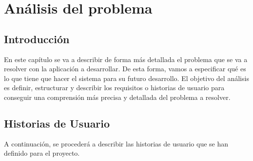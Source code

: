 \chapter{Análisis del problema}

\section{Introducción}
En este capítulo se va a describir de forma más detallada el problema que se va a resolver con la aplicación a desarrollar. De esta forma, vamos a especificar qué es lo que 
tiene que hacer el sistema para su futuro desarrollo. El objetivo del análisis es definir, estructurar y describir los requisitos o historias de usuario para conseguir una comprensión
más precisa y detallada del problema a resolver.
\section{Historias de Usuario}
A continuación, se procederá a describir las historias de usuario que se han definido para el proyecto. 

